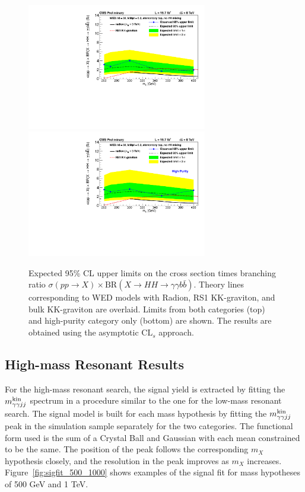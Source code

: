 \begin{figure}[ht!]
 \begin{center}
   \includegraphics[width=0.7\textwidth]{figures/results/WP4_cutbased_low_all.pdf}
   \includegraphics[width=0.7\textwidth]{figures/results/WP4_cutbased_low_base_onecat.pdf}
 \end{center}
\caption{Expected 95\% CL upper limits on the cross section times branching ratio
$\sigma(pp\rightarrow X) \times \text{BR}( X \rightarrow HH \rightarrow \gamma\gamma b\bar{b})$.
Theory lines corresponding to WED models with Radion, RS1 KK-graviton, and bulk KK-graviton are
overlaid. Limits from both categories (top) and high-purity category only (bottom) are shown.
The results are obtained using the asymptotic $\text{CL}_s$ approach.}
\label{fig:limits_lowmassres}
\end{figure}

\subsection{High-mass Resonant Results}

For the high-mass resonant search, the signal yield is extracted by fitting the $m_{\gamma\gamma jj}^{\rm kin}$ spectrum
in a procedure similar to the one for the low-mass resonant search. The signal model is built
for each mass hypothesis by fitting the $m_{\gamma\gamma jj}^{\rm kin}$ peak in the simulation sample separately for the
two categories. The functional form used is the sum of a Crystal Ball and Gaussian with each mean
constrained to be the same. The position of the peak follows the corresponding $m_X$
hypothesis closely,
and the resolution in the peak improves as $m_X$ increases. Figure~\ref{fig:sigfit_500_1000}
shows examples of the signal fit for mass hypotheses of 500 GeV and 1 TeV.

